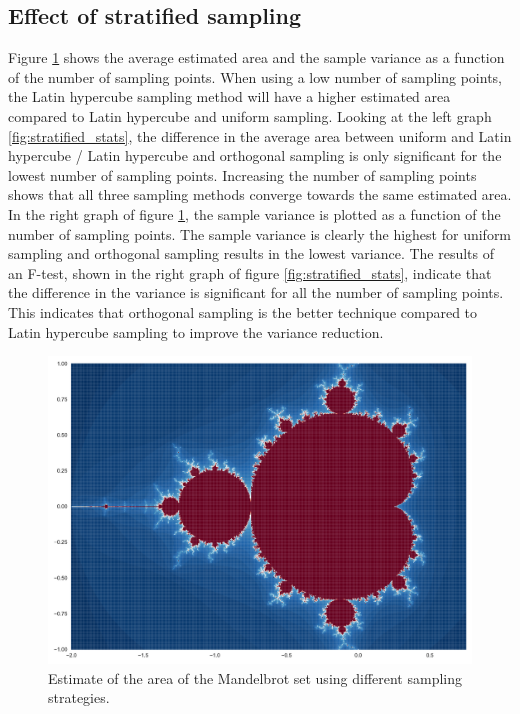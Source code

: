 \documentclass{uva-inf-article}
\begin{document}
\subsection{Effect of stratified sampling}

Figure \ref{fig:stratified} shows the average estimated area and the sample variance as a function of the number of sampling points.
When using a low number of sampling points, the Latin hypercube sampling method will have a higher estimated area compared to Latin hypercube and uniform sampling. Looking at the left graph \ref{fig:stratified_stats}, the difference in the average area between uniform and Latin hypercube / Latin hypercube and orthogonal sampling is only significant for the lowest number of sampling points.
Increasing the number of sampling points shows that all three sampling methods converge towards the same estimated area.\\

In the right graph of figure \ref{fig:stratified}, the sample variance is plotted as a function of the number of sampling points. The sample variance is clearly the highest for uniform sampling and orthogonal sampling results in the lowest variance. The results of an F-test, shown in the right graph of figure \ref{fig:stratified_stats}, indicate that the difference in the variance is significant for all the number of sampling points.
This indicates that orthogonal sampling is the better technique compared to Latin hypercube sampling to improve the variance reduction.

\begin{figure}[h]
    \centering
    \includegraphics[width=.85\textwidth]{graphs/fractal.pdf}
    \caption{Estimate of the area of the Mandelbrot set using different sampling strategies.}
    \label{fig:stratified}
\end{figure}
\end{document}
